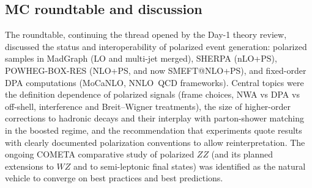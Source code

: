 \subsection{MC roundtable and discussion}
The roundtable, continuing the thread opened by the Day-1 theory review,
discussed the status and interoperability of polarized event generation:
polarized samples in MadGraph (LO and multi-jet merged), SHERPA (nLO+PS),
POWHEG-BOX-RES (NLO+PS, and now SMEFT@NLO+PS), and fixed-order DPA computations
(MoCaNLO, NNLO~QCD frameworks). Central topics were the definition dependence
of polarized signals (frame choices, NWA vs DPA vs off-shell, interference and
Breit--Wigner treatments), the size of higher-order corrections to hadronic
decays and their interplay with parton-shower matching in the boosted regime,
and the recommendation that experiments quote results with clearly documented
polarization conventions to allow reinterpretation. The ongoing COMETA
comparative study of polarized $ZZ$ (and its planned extensions to $WZ$ and to
semi-leptonic final states) was identified as the natural vehicle to converge
on best practices and best predictions.
